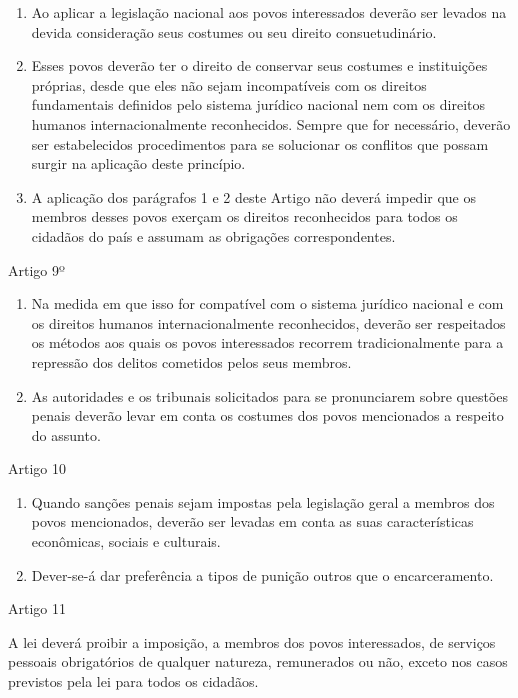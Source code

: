 \documentclass[
]{book}
\begin{document}
\begin{enumerate}
\def\labelenumi{\arabic{enumi}.}
\item
  Ao aplicar a legislação nacional aos povos interessados deverão ser levados na devida consideração seus costumes ou seu direito consuetudinário.
\item
  Esses povos deverão ter o direito de conservar seus costumes e instituições próprias, desde que eles não sejam incompatíveis com os direitos fundamentais definidos pelo sistema jurídico nacional nem com os direitos humanos internacionalmente reconhecidos. Sempre que for necessário, deverão ser estabelecidos procedimentos para se solucionar os conflitos que possam surgir na aplicação deste princípio.
\item
  A aplicação dos parágrafos 1 e 2 deste Artigo não deverá impedir que os membros desses povos exerçam os direitos reconhecidos para todos os cidadãos do país e assumam as obrigações correspondentes.
\end{enumerate}

Artigo 9º

\begin{enumerate}
\def\labelenumi{\arabic{enumi}.}
\item
  Na medida em que isso for compatível com o sistema jurídico nacional e com os direitos humanos internacionalmente reconhecidos, deverão ser respeitados os métodos aos quais os povos interessados recorrem tradicionalmente para a repressão dos delitos cometidos pelos seus membros.
\item
  As autoridades e os tribunais solicitados para se pronunciarem sobre questões penais deverão levar em conta os costumes dos povos mencionados a respeito do assunto.
\end{enumerate}

Artigo 10

\begin{enumerate}
\def\labelenumi{\arabic{enumi}.}
\item
  Quando sanções penais sejam impostas pela legislação geral a membros dos povos mencionados, deverão ser levadas em conta as suas características econômicas, sociais e culturais.
\item
  Dever-se-á dar preferência a tipos de punição outros que o encarceramento.
\end{enumerate}

Artigo 11

A lei deverá proibir a imposição, a membros dos povos interessados, de serviços pessoais obrigatórios de qualquer natureza, remunerados ou não, exceto nos casos previstos pela lei para todos os cidadãos.
\end{document}
